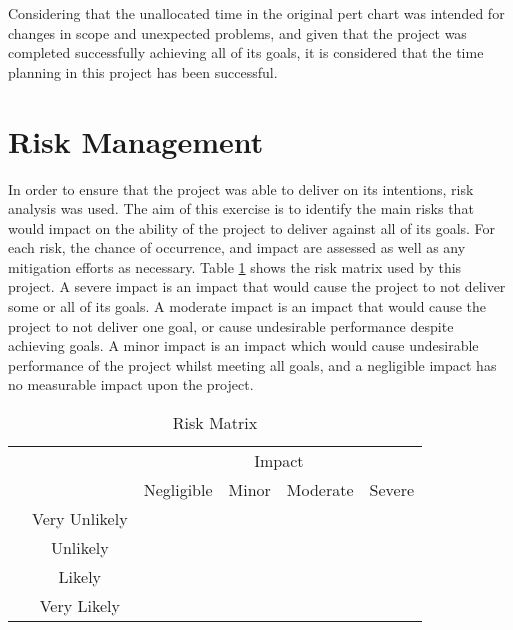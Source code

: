 Considering that the unallocated time in the original \gls{pert} chart was intended for changes in scope and unexpected problems, and given that the project was completed successfully achieving all of its goals, it is considered that the time planning in this project has been successful.

\section{Risk Management}

In order to ensure that the project was able to deliver on its intentions, risk analysis was used. The aim of this exercise is to identify the main risks that would impact on the ability of the project to deliver against all of its goals. For each risk, the chance of occurrence, and impact are assessed as well as any mitigation efforts as necessary. Table \ref{tbl:risk-matrix} shows the risk matrix used by this project. A severe impact is an impact that would cause the project to not deliver some or all of its goals. A moderate impact is an impact that would cause the project to not deliver one goal, or cause undesirable performance despite achieving goals. A minor impact is an impact which would cause undesirable performance of the project whilst meeting all goals, and a negligible impact has no measurable impact upon the project.


\newcommand{\riskCellWidth}{2cm}
\newcommand{\riskCellheight}{1cm}
\newcommand{\badCol}{\cellcolor{red!50}} %
\newcommand{\midCol}{\cellcolor{yellow!50}}
\newcommand{\goodCol}{\cellcolor{green!50}}
\begin{table}[ht]
	\centering
	\caption{Risk Matrix} \label{tbl:risk-matrix}
	\begin{tabular}{|c|c|p{\riskCellWidth}|p{\riskCellWidth}|p{\riskCellWidth}|p{\riskCellWidth}|}
		\cline{3-6}
		\multicolumn{2}{c|}{} &  \multicolumn{4}{c|}{Impact}\\
		\cline{3-6}
		\multicolumn{2}{c|}{} & Negligible & Minor & Moderate & Severe \\
		\hline
		\multirow{4}{*}[-1cm]{\rotatebox[origin=c]{90}{Chance of Occurrence}} & Very Unlikely & \goodCol &\goodCol &\goodCol & \midCol  \\ [\riskCellheight]
		\hhline{|~|-----}
		& Unlikely & \goodCol &\goodCol &\midCol & \badCol  \\ [\riskCellheight]
		\hhline{|~|-----}
		& Likely & \goodCol &\midCol &\badCol & \badCol  \\ [\riskCellheight]
		\hhline{|~|-----}
		& Very Likely & \midCol &\badCol &\badCol & \badCol \\ [\riskCellheight]
		\hline
	\end{tabular}
\end{table}


